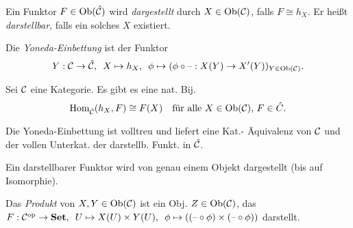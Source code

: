 \documentclass{cheat-sheet}
\newenvironment{centertikz}
  {\begin{center}\begin{tikzpicture}}
  {\end{tikzpicture}\end{center}}
\begin{document}
\begin{defn}
  Ein Funktor $F \in \operatorname{Ob}(\hat{\mathcal{C}})$ wird \emph{dargestellt} durch $X \in \operatorname{Ob}(\mathcal{C})$, falls $F \cong h_X$.
  Er heißt \emph{darstellbar}, falls ein solches $X$ existiert.
\end{defn}

\begin{defn}
  Die \emph{Yoneda-Einbettung} ist der Funktor
  \[ Y : \mathcal{C} \to \hat{\mathcal{C}}, \enspace X \mapsto h_X, \enspace \phi \mapsto (\phi \circ \text{--} : X(Y) \to X'(Y))_{Y \in \operatorname{Ob}(\mathcal{C})}. \]
\end{defn}

\begin{lem}
  Sei $\mathcal{C}$ eine Kategorie. Es gibt es eine nat. Bij.
  \[
    \operatorname{Hom}_{\hat{\mathcal{C}}}(h_X, F) \cong F(X) \quad
    \text{für alle $X \in \operatorname{Ob}(\mathcal{C})$, $F \in \hat{C}$.}
  \]
\end{lem}

\begin{kor}
  Die Yoneda-Einbettung ist volltreu und liefert eine Kat.- Äquivalenz von $\mathcal{C}$ und der vollen Unterkat. der darstellb. Funkt. in $\hat{\mathcal{C}}$.
\end{kor}

\begin{kor}
  Ein darstellbarer Funktor wird von genau einem Objekt dargestellt (bis auf Isomorphie).
\end{kor}

\begin{defn}
  Das \emph{Produkt} von $X, Y \in \operatorname{Ob}(\mathcal{C})$ ist ein Obj. $Z \in \operatorname{Ob}(\mathcal{C})$, das
  $F : \mathcal{C}^{\mathrm{op}} \to \mathbf{Set}, \enspace U \mapsto X(U) \times Y(U), \enspace \phi \mapsto ((\text{--} \circ \phi) \times (\text{--} \circ \phi))$ darstellt.
\end{defn}

\end{document}
